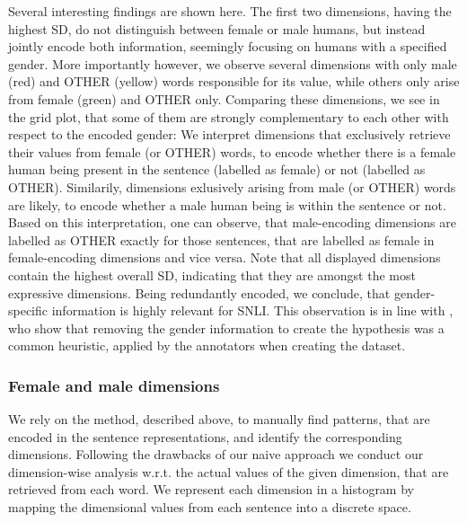 Several interesting findings are shown here. The first two dimensions, having the highest \ac{SD}, do not distinguish between female or male humans, but instead jointly encode both information, seemingly focusing on humans with a specified gender. More importantly however, we observe several dimensions with only male (red) and OTHER (yellow) words responsible for its value, while others only arise from female (green) and OTHER only. Comparing these dimensions, we see in the grid plot, that some of them are strongly complementary to each other with respect to the encoded gender: We interpret dimensions that exclusively retrieve their values from female (or OTHER) words, to encode whether there is a female human being present in the sentence (labelled as female) or not (labelled as OTHER). Similarily, dimensions exlusively arising from male (or OTHER) words are likely, to encode whether a male human being is within the sentence or not. Based on this interpretation, one can observe, that male-encoding dimensions are labelled as OTHER exactly for those sentences, that are labelled as female in female-encoding dimensions and vice versa. Note that all displayed dimensions contain the highest overall \ac{SD}, indicating that they are amongst the most expressive dimensions. Being redundantly encoded, we conclude, that gender-specific information is highly relevant for \ac{SNLI}. This observation is in line with \cite{gururangan2018annotation}, who show that removing the gender information to create the hypothesis was a common heuristic, applied by the annotators when creating the dataset.

\subsubsection{Female and male dimensions}\label{sec:understanding2}
We rely on the method, described above, to manually find patterns, that are encoded in the sentence representations, and identify the corresponding dimensions. Following the drawbacks of our naive approach we conduct our dimension-wise analysis w.r.t. the actual values of the given dimension, that are retrieved from each word. We represent each dimension in a histogram by mapping the dimensional values from each sentence into a discrete space.
